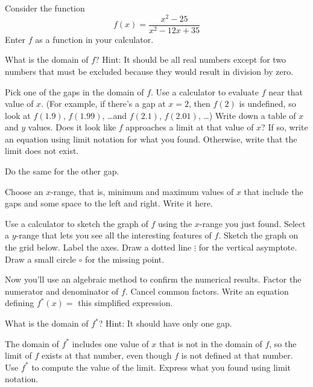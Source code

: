 
Consider the function
\begin{equation*}
 f(x) = \frac{x^2 - 25}{x^2 - 12x + 35}
\end{equation*}
Enter $f$ as a function in your calculator.

\begin{ProblemSet}
 \begin{Problem}
  What is the domain of $f$?
  Hint: It should be all real numbers except for two numbers that must be excluded because they would result in division by zero.
 \end{Problem}
 \begin{Problem}[pencil space=2in]
  Pick one of the gaps in the domain of $f$.
  Use a calculator to evaluate $f$ near that value of $x$.
  (For example, if there's a gap at $x = 2$, then $f(2)$ is undefined, so look at $f(1.9)$, $f(1.99)$, \dots and $f(2.1)$, $f(2.01)$, \dots)
  Write down a table of $x$ and $y$ values.
  Does it look like $f$ approaches a limit at that value of $x$?
  If so, write an equation using limit notation for what you found.
  Otherwise, write that the limit does not exist.
 \end{Problem}
 \begin{Problem}[pencil space=2in]
  Do the same for the other gap.
 \end{Problem}
 \begin{Problem}
  Choose an $x$-range, that is, minimum and maximum values of $x$ that include the gaps and some space to the left and right.
  Write it here.
 \end{Problem}
 \begin{Problem}
  Use a calculator to sketch the graph of $f$ using the $x$-range you just found.
  Select a $y$-range that lets you see all the interesting features of $f$.
  Sketch the graph on the grid below.
  Label the axes.
  Draw a dotted line $\vdots$ for the vertical asymptote.
  Draw a small circle $\circ$ for the missing point.
  \bigskip

  \GraphingGrid
 \end{Problem}
 \begin{Problem}[pencil space=3in]
  Now you'll use an algebraic method to confirm the numerical results.
  Factor the numerator and denominator of $f$.
  Cancel common factors.
  Write an equation defining $f^*(x) =$ this simplified expression.
 \end{Problem}
 \begin{Problem}
  What is the domain of $f^*$?
  Hint: It should have only one gap.
 \end{Problem}
 \begin{Problem}[pencil space=2in]
  The domain of $f^*$ includes one value of $x$ that is not in the domain of $f$, so the limit of $f$ exists at that number, even though $f$ is not defined at that number.
  Use $f^*$ to compute the value of the limit.
  Express what you found using limit notation.
 \end{Problem}
\end{ProblemSet}

